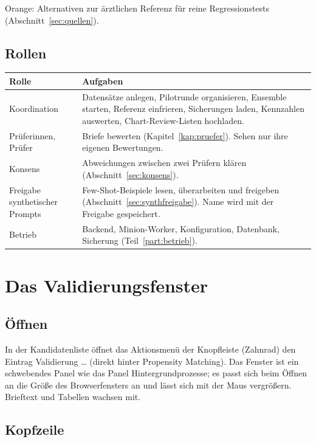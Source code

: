 \documentclass[11pt,a4paper,parskip=half-,headings=standardclasses,toc=bibliography,open=any]{scrreprt}
\begin{document}
Orange: Alternativen zur ärztlichen Referenz für reine Regressionstests (Abschnitt~\ref{sec:quellen}).

\section{Rollen}

\begin{tabularx}{\textwidth}{@{}P{3.6cm}L@{}}
\toprule
\textbf{Rolle} & \textbf{Aufgaben}\\
\midrule
Koordination & Datensätze anlegen, Pilotrunde organisieren, Ensemble starten, Referenz einfrieren, Sicherungen laden, Kennzahlen auswerten, Chart-Review-Listen hochladen.\\
Prüferinnen, Prüfer & Briefe bewerten (Kapitel~\ref{kap:pruefer}). Sehen nur ihre eigenen Bewertungen.\\
Konsens & Abweichungen zwischen zwei Prüfern klären (Abschnitt~\ref{sec:konsens}).\\
Freigabe synthetischer Prompts & Few-Shot-Beispiele lesen, überarbeiten und freigeben (Abschnitt~\ref{sec:synthfreigabe}). Name wird mit der Freigabe gespeichert.\\
Betrieb & Backend, Minion-Worker, Konfiguration, Datenbank, Sicherung (Teil~\ref{part:betrieb}).\\
\bottomrule
\end{tabularx}

\chapter{Das Validierungsfenster}

\section{Öffnen}

In der Kandidatenliste öffnet das Aktionsmenü der Knopfleiste (Zahnrad) den Eintrag \textsf{Validierung …} (direkt hinter \textsf{Propensity Matching}). Das Fenster ist ein schwebendes Panel wie das Panel \textsf{Hintergrundprozesse}; es passt sich beim Öffnen an die Größe des Browserfensters an und lässt sich mit der Maus vergrößern. Brieftext und Tabellen wachsen mit.

\section{Kopfzeile}
\end{document}
